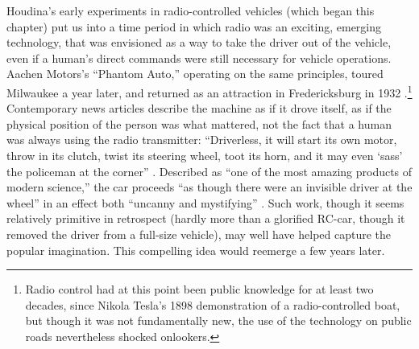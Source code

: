 Houdina's early experiments in radio-controlled vehicles (which began
this chapter) put us into a time period in which radio was an
exciting, emerging technology, that was envisioned as a way to take
the driver out of the vehicle, even if a human's direct commands were
still necessary for vehicle operations. Aachen Motors's ``Phantom
Auto,'' operating on the same principles, toured Milwaukee a year
later, \cite{phantomAuto} and returned as an attraction in
Fredericksburg in 1932 \cite{phantomAuto2}.\footnote{Radio control had
  at this point been public knowledge for at least two 
decades, since Nikola Tesla's 1898 demonstration of a radio-controlled
boat, but though it was not fundamentally new, the use of the
technology on public roads nevertheless shocked onlookers.} Contemporary news articles
describe the machine as if it drove itself, 
as if the physical position of the person was what mattered, not the
fact that a human was always using the radio transmitter:  ``Driverless,
it will start its own motor, throw in its clutch, twist its steering
wheel, toot its horn, and it may even `sass' the policeman at the
corner'' \cite{phantomAuto}. Described as ``one of the most amazing products of
modern science,'' the 
car proceeds ``as though there were an invisible driver at the wheel''
in an effect both ``uncanny and mystifying'' \cite{phantomAuto2}. Such work,
though it seems relatively primitive in retrospect (hardly more than a
glorified RC-car, though it removed the driver from a full-size vehicle), may well have
helped capture the popular imagination. This compelling idea would reemerge
a few years later.



